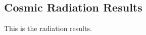 \subsection{Cosmic Radiation Results}
\label{sec:Cosmic-Radiation-Results}

This is the radiation results.
